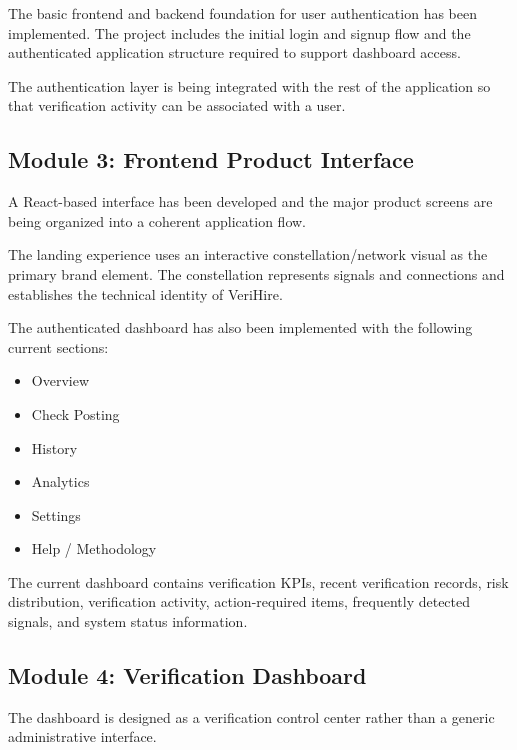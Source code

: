 \documentclass[12pt,a4paper]{report}
\begin{document}
The basic frontend and backend foundation for user authentication has been implemented. The project includes the initial login and signup flow and the authenticated application structure required to support dashboard access.

The authentication layer is being integrated with the rest of the application so that verification activity can be associated with a user.


\subsection{Module 3: Frontend Product Interface}

A React-based interface has been developed and the major product screens are being organized into a coherent application flow.

The landing experience uses an interactive constellation/network visual as the primary brand element. The constellation represents signals and connections and establishes the technical identity of VeriHire.

The authenticated dashboard has also been implemented with the following current sections:

\begin{itemize}

    \item Overview

    \item Check Posting

    \item History

    \item Analytics

    \item Settings

    \item Help / Methodology

\end{itemize}

The current dashboard contains verification KPIs, recent verification records, risk distribution, verification activity, action-required items, frequently detected signals, and system status information.


\subsection{Module 4: Verification Dashboard}

The dashboard is designed as a verification control center rather than a generic administrative interface.
\end{document}

